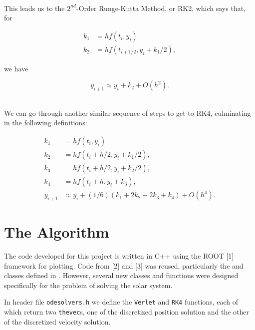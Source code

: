 \documentclass[12pt]{article}
\numberwithin{equation}{section}
\begin{document}
\\\indent This leads us to the $2^{nd}$-Order Runge-Kutta Method, or RK2, which says that, for

\begin{equation}
\label{eq:rk2part1}
\begin{align}
k_{1} & = hf\left(t_{i},y_{i}\right) \\
k_{2} & = hf\left(t_{i+1/2},y_{i}+k_{1}/2\right),
\end{align}
\end{equation}

\noindent we have

\begin{equation}
\label{eq:re2part2}
y_{i+1} \approx y_{i}+k_{2}+O\left(h^{2}\right).
\end{equation}

\\\indent We can go through another similar sequence of steps to get to RK4, culminating in the following definitions:

\begin{equation}
\label{eq:rk4}
\begin{align}
k_{1} & = hf\left(t_{i},y_{i}\right) \\
k_{2} & = hf\left(t_{i}+h/2,y_{i}+k_{1}/2\right), \\
k_{3} & = hf\left(t_{i}+h/2,y_{i}+k_{2}/2\right), \\
k_{4} & = hf\left(t_{i}+h,y_{i}+k_{3}\right), \\
y_{i+1} & \approx y_{i}+\left(1/6\right)\left(k_{1}+2k_{2}+2k_{3}+k_{4}\right)+O\left(h^{4}\right).
\end{align}
\end{equation}

\section{The Algorithm}
\label{sec:algorithm}

The code developed for this project is written in C++ using the ROOT [1] framework for plotting.  Code from [2] and [3] was reused, particularly the  and  classes defined in .  However, several new classes and functions were designed specifically for the problem of solving the solar system.
\par In header file \texttt{odesolvers.h} we define the \texttt{Verlet} and \texttt{RK4} functions, each of which return two \texttt{thevec}s, one of the discretized position solution and the other of the discretized velocity solution.  
\end{document}
